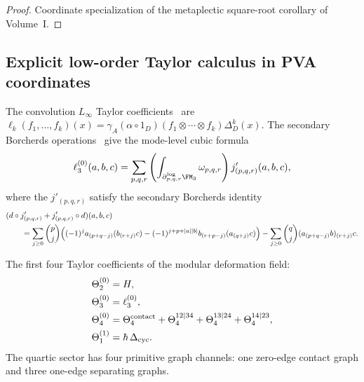 \begin{proof}
Coordinate specialization of
the metaplectic square-root corollary of Volume~I.
\end{proof}


\subsection{Explicit low-order Taylor calculus in PVA coordinates}
\label{subsec:vol2-explicit-low-order-taylor-calculus}

The convolution $L_\infty$ Taylor coefficients~\cite[Theorem~5.1]{RNW19}
are
$\ell_k(f_1,\dots,f_k)(x)
=
\gamma_A(\alpha\circ 1_D)(f_1\otimes\cdots\otimes f_k)\Delta_D^k(x)$.
The secondary Borcherds operations~\cite{MS24} give the mode-level
cubic formula
\begin{equation}
\label{eq:vol2-explicit-l3-secondary-borcherds}
\ell_3^{(0)}(a,b,c)
=
\sum_{p,q,r}
\left(
\int_{\partial^{\log}_{p,q,r}\FM_3} \omega_{p,q,r}
\right)
 j'_{(p,q,r)}(a,b,c),
\end{equation}
where the $j'_{(p,q,r)}$ satisfy the secondary Borcherds identity
\begin{align}
\label{eq:vol2-secondary-borcherds-identity}
&(d\circ j'_{(p,q,r)}+j'_{(p,q,r)}\circ d)(a,b,c)
\notag\\
&\qquad=
\sum_{j\ge 0}\binom{p}{j}
\Bigl(
(-1)^j a_{(p+q-j)}(b_{(r+j)}c)
-(-1)^{j+p+|a||b|}b_{(r+p-j)}(a_{(q+j)}c)
\Bigr)
-\sum_{j\ge 0}\binom{q}{j}(a_{(p+q-j)}b)_{(r+j)}c.
\end{align}

\begin{proposition}
\label{prop:vol2-quartic-channels-and-loop-term}
The first four Taylor coefficients of the modular deformation field:
\begin{align}
\label{eq:vol2-low-order-atlas}
\Theta_{2}^{(0)} &= H,
\notag\\
\Theta_{3}^{(0)} &= \ell_3^{(0)},
\notag\\
\Theta_{4}^{(0)} &= \Theta_{4}^{\mathrm{contact}} + \Theta_{4}^{12\mid 34} + \Theta_{4}^{13\mid 24} + \Theta_{4}^{14\mid 23},
\notag\\
\Theta_{1}^{(1)} &= \hbar\,\Delta_{\mathrm{cyc}}.
\end{align}
The quartic sector has four primitive graph channels: one zero-edge
contact graph and three one-edge separating graphs.
\end{proposition}

